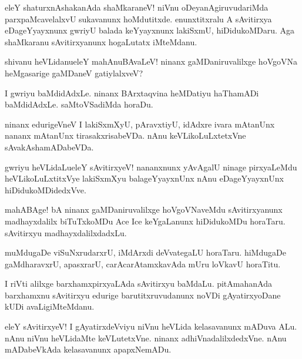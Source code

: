 \begin{mng}
eleY shaturxnAshakanAda shaMkaraneV! niVnu oDeyanAgiruvudariMda parxpaMcavelalxvU sukavanunx hoMdutitxde. enunxtitxralu A sAvitirxya eDageYyayxnunx gwriyU balada keYyayxnunx lakiSxmU, hiDidukoMDaru. Aga shaMkaranu sAvitirxyanunx hogaLutatx iMteMdanu.
\end{mng}

\begin{mng}
shivanu heVLidanu\mdash eleY mahAnuBAvaLeV! ninanx gaMDaniruvalilxge hoVgoVNa heMgasarige gaMDaneV gatiylalxveV?
\end{mng}

\begin{mng}
I gwriyu baMdidAdxLe. ninanx BArxtaqvina heMDatiyu haThamADi baMdidAdxLe. saMtoVSadiMda horaDu.
\end{mng}

\begin{mng}
ninanx edurigeVneV I lakiSxmXyU, pAravxtiyU, idAdxre ivara mAtanUnx nananx mAtanUnx tirasakxrisabeVDa. nAnu keVLikoLuLxtetxVne sAvakAshamADabeVDa.
\end{mng}

\begin{mng}
gwriyu heVLidaLu\mdash eleY sAvitirxyeV! nananxnunx yAvAgalU ninage pirxyaLeMdu heVLikoLuLxtitxVye lakiSxmXyu balageYyayxnUnx nAnu eDageYyayxnUnx hiDidukoMDidedxVve.
\end{mng}

\begin{mng}
mahABAge! bA ninanx gaMDaniruvalilxge hoVgoVNaveMdu sAvitirxyanunx madhayxdalilx biTuTxkoMDu Ace Ice keYgaLanunx hiDidukoMDu horaTaru. sAvitirxyu madhayxdalilxdadxLu.
\end{mng}

\begin{mng}
muMdugaDe viSuNxrudarxrU, iMdArxdi deVvategaLU horaTaru. hiMdugaDe gaMdharavxrU, apasxrarU, carAcarAtamxkavAda mUru loVkavU horaTitu.
\end{mng}

\begin{mng}
I riVti alilxge barxhamxpirxyaLAda sAvitirxyu baMdaLu. pitAmahanAda barxhamxnu sAvitirxyu edurige barutitxruvudanunx noVDi gAyatirxyoDane kUDi avaLigiMteMdanu.
\end{mng}

\begin{mng}
eleY sAvitirxyeV! I gAyatirxdeVviyu niVnu heVLida kelasavanunx mADuva ALu. nAnu niVnu heVLidaMte keVLutetxVne. ninanx adhiVnadalilxdedxVne. nAnu mADabeVkAda kelasavanunx apapxNemADu.
\end{mng}

